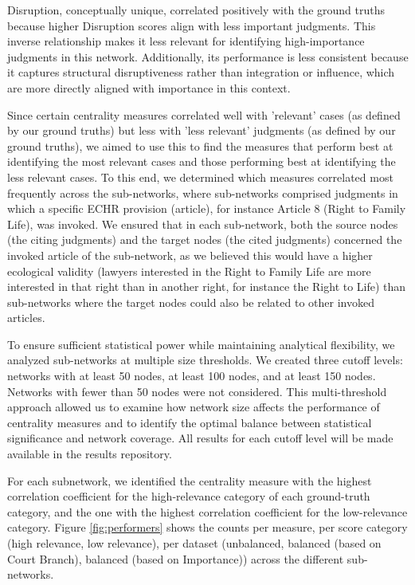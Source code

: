\documentclass[sigconf,authordraft]{acmart}
\begin{document}
Disruption, conceptually unique, correlated positively with the ground truths because higher Disruption scores align with less important judgments. This inverse relationship makes it less relevant for identifying high-importance judgments in this network. Additionally, its performance is less consistent because it captures structural disruptiveness rather than integration or influence, which are more directly aligned with importance in this context.

Since certain centrality measures correlated well with 'relevant' cases (as defined by our ground truths) but less with 'less relevant' judgments (as defined by our ground truths), we aimed to use this to find the measures that perform best at identifying the most relevant cases and those performing best at identifying the less relevant cases. To this end, we determined which measures correlated most frequently across the sub-networks, where sub-networks comprised judgments in which a specific ECHR provision (article), for instance Article 8 (Right to Family Life), was invoked. We ensured that in each sub-network, both the source nodes (the citing judgments) and the target nodes (the cited judgments) concerned the invoked article of the sub-network, as we believed this would have a higher ecological validity (lawyers interested in the Right to Family Life are more interested in that right than in another right, for instance the Right to Life) than sub-networks where the target nodes could also be related to other invoked articles.

To ensure sufficient statistical power while maintaining analytical flexibility, we analyzed sub-networks at multiple size thresholds. We created three cutoff levels: networks with at least 50 nodes, at least 100 nodes, and at least 150 nodes. Networks with fewer than 50 nodes were not considered. This multi-threshold approach allowed us to examine how network size affects the performance of centrality measures and to identify the optimal balance between statistical significance and network coverage. All results for each cutoff level will be made available in the results repository.

For each subnetwork, we identified the centrality measure with the highest correlation coefficient for the high-relevance category of each ground-truth category, and the one with the highest correlation coefficient for the low-relevance category. Figure \ref{fig:performers} shows the counts per measure, per score category (high relevance, low relevance), per dataset (unbalanced, balanced (based on Court Branch), balanced (based on Importance)) across the different sub-networks.
\end{document}
